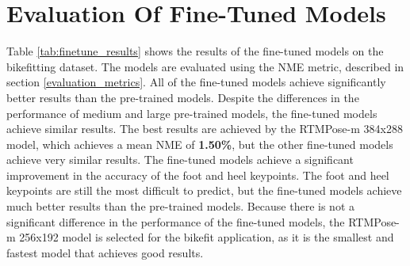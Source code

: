 \section{Evaluation Of Fine-Tuned Models}
\label{fine_tuning_results}
Table \ref{tab:finetune_results} shows the results of the fine-tuned models on the bikefitting dataset. The models are evaluated using the NME metric, described in section \ref{evaluation_metrics}. All of the fine-tuned models achieve significantly better results than the pre-trained models. Despite the differences in the performance of medium and large pre-trained models, the fine-tuned models achieve similar results. The best results are achieved by the RTMPose-m 384x288 model, which achieves a mean NME of \textbf{1.50\%}, but the other fine-tuned models achieve very similar results. The fine-tuned models achieve a significant improvement in the accuracy of the foot and heel keypoints. The foot and heel keypoints are still the most difficult to predict, but the fine-tuned models achieve much better results than the pre-trained models. Because there is not a significant difference in the performance of the fine-tuned models, the RTMPose-m 256x192 model is selected for the bikefit application, as it is the smallest and fastest model that achieves good results.

\def\imgwidth{0.48\textwidth}
\def\smallimgwidth{1.0\textwidth}

